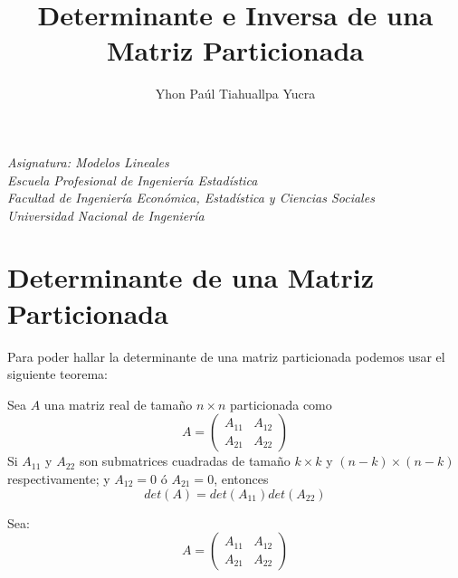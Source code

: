 \documentclass[12pt]{article}
\title{\textbf{Determinante e Inversa de una Matriz Particionada}}
\author{Yhon Paúl Tiahuallpa Yucra}
\date{}%
\begin{document}
\maketitle
\begin{center}
\itshape Asignatura: Modelos Lineales\\
Escuela Profesional de Ingeniería Estadística\\
Facultad de Ingeniería Económica, Estadística y Ciencias Sociales\\
Universidad Nacional de Ingeniería
\end{center}






\section*{Determinante de una Matriz Particionada}

Para poder hallar la determinante de una matriz particionada podemos usar el siguiente teorema:

\begin{center}\label{propiedad}
\begin{tcolorbox}[colback=blue!10!white,colframe=white,width=15 cm]
\sffamily Sea $A$ una matriz real de tamaño $n \times n$ particionada como 
\begin{equation*}
    A = \begin{pmatrix} A_{11} & A_{12}\\ A_{21} & A_{22} \end{pmatrix}
\end{equation*}
Si $A_{11}$ y $A_{22}$ son submatrices cuadradas de tamaño $k \times k$ y $(n - k) \times (n - k)$ respectivamente; y $A_{12} = 0$ ó $A_{21} = 0$, entonces
$$det(A) = det(A_{11})det(A_{22})$$
\end{tcolorbox}
\end{center}



Sea:
\begin{equation*}
    A = \begin{pmatrix} A_{11} & A_{12}\\ A_{21} & A_{22} \end{pmatrix}
\end{equation*}
\end{document}
